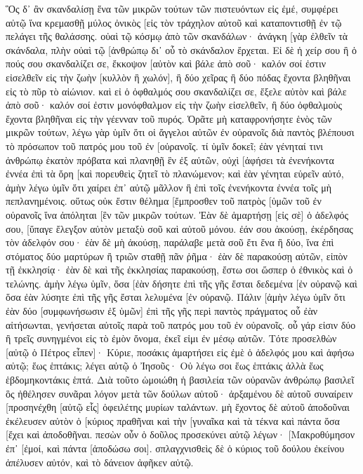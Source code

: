 Ὃς δ᾽ ἂν σκανδαλίσῃ ἕνα τῶν μικρῶν τούτων τῶν πιστευόντων εἰς ἐμέ, συμφέρει αὐτῷ ἵνα κρεμασθῇ μύλος ὀνικὸς [εἰς τὸν τράχηλον αὐτοῦ καὶ καταποντισθῇ ἐν τῷ πελάγει τῆς θαλάσσης. 
οὐαὶ τῷ κόσμῳ ἀπὸ τῶν σκανδάλων· ἀνάγκη [γὰρ ἐλθεῖν τὰ σκάνδαλα, πλὴν οὐαὶ τῷ [ἀνθρώπῳ δι᾽ οὗ τὸ σκάνδαλον ἔρχεται. 
Εἰ δὲ ἡ χείρ σου ἢ ὁ πούς σου σκανδαλίζει σε, ἔκκοψον [αὐτὸν καὶ βάλε ἀπὸ σοῦ· καλόν σοί ἐστιν εἰσελθεῖν εἰς τὴν ζωὴν [κυλλὸν ἢ χωλόν], ἢ δύο χεῖρας ἢ δύο πόδας ἔχοντα βληθῆναι εἰς τὸ πῦρ τὸ αἰώνιον. 
καὶ εἰ ὁ ὀφθαλμός σου σκανδαλίζει σε, ἔξελε αὐτὸν καὶ βάλε ἀπὸ σοῦ· καλόν σοί ἐστιν μονόφθαλμον εἰς τὴν ζωὴν εἰσελθεῖν, ἢ δύο ὀφθαλμοὺς ἔχοντα βληθῆναι εἰς τὴν γέενναν τοῦ πυρός. 
Ὁρᾶτε μὴ καταφρονήσητε ἑνὸς τῶν μικρῶν τούτων, λέγω γὰρ ὑμῖν ὅτι οἱ ἄγγελοι αὐτῶν ἐν οὐρανοῖς διὰ παντὸς βλέπουσι τὸ πρόσωπον τοῦ πατρός μου τοῦ ἐν [οὐρανοῖς. 
τί ὑμῖν δοκεῖ; ἐὰν γένηταί τινι ἀνθρώπῳ ἑκατὸν πρόβατα καὶ πλανηθῇ ἓν ἐξ αὐτῶν, οὐχὶ [ἀφήσει τὰ ἐνενήκοντα ἐννέα ἐπὶ τὰ ὄρη [καὶ πορευθεὶς ζητεῖ τὸ πλανώμενον; 
καὶ ἐὰν γένηται εὑρεῖν αὐτό, ἀμὴν λέγω ὑμῖν ὅτι χαίρει ἐπ᾽ αὐτῷ μᾶλλον ἢ ἐπὶ τοῖς ἐνενήκοντα ἐννέα τοῖς μὴ πεπλανημένοις. 
οὕτως οὐκ ἔστιν θέλημα [ἔμπροσθεν τοῦ πατρὸς [ὑμῶν τοῦ ἐν οὐρανοῖς ἵνα ἀπόληται [ἓν τῶν μικρῶν τούτων. 
Ἐὰν δὲ ἁμαρτήσῃ [εἰς σὲ] ὁ ἀδελφός σου, [ὕπαγε ἔλεγξον αὐτὸν μεταξὺ σοῦ καὶ αὐτοῦ μόνου. ἐάν σου ἀκούσῃ, ἐκέρδησας τὸν ἀδελφόν σου· 
ἐὰν δὲ μὴ ἀκούσῃ, παράλαβε μετὰ σοῦ ἔτι ἕνα ἢ δύο, ἵνα ἐπὶ στόματος δύο μαρτύρων ἢ τριῶν σταθῇ πᾶν ῥῆμα· 
ἐὰν δὲ παρακούσῃ αὐτῶν, εἰπὸν τῇ ἐκκλησίᾳ· ἐὰν δὲ καὶ τῆς ἐκκλησίας παρακούσῃ, ἔστω σοι ὥσπερ ὁ ἐθνικὸς καὶ ὁ τελώνης. 
ἀμὴν λέγω ὑμῖν, ὅσα [ἐὰν δήσητε ἐπὶ τῆς γῆς ἔσται δεδεμένα [ἐν οὐρανῷ καὶ ὅσα ἐὰν λύσητε ἐπὶ τῆς γῆς ἔσται λελυμένα [ἐν οὐρανῷ. 
Πάλιν [ἀμὴν λέγω ὑμῖν ὅτι ἐὰν δύο [συμφωνήσωσιν ἐξ ὑμῶν] ἐπὶ τῆς γῆς περὶ παντὸς πράγματος οὗ ἐὰν αἰτήσωνται, γενήσεται αὐτοῖς παρὰ τοῦ πατρός μου τοῦ ἐν οὐρανοῖς. 
οὗ γάρ εἰσιν δύο ἢ τρεῖς συνηγμένοι εἰς τὸ ἐμὸν ὄνομα, ἐκεῖ εἰμι ἐν μέσῳ αὐτῶν. 
Τότε προσελθὼν [αὐτῷ ὁ Πέτρος εἶπεν]· Κύριε, ποσάκις ἁμαρτήσει εἰς ἐμὲ ὁ ἀδελφός μου καὶ ἀφήσω αὐτῷ; ἕως ἑπτάκις; 
λέγει αὐτῷ ὁ Ἰησοῦς· Οὐ λέγω σοι ἕως ἑπτάκις ἀλλὰ ἕως ἑβδομηκοντάκις ἑπτά. 
Διὰ τοῦτο ὡμοιώθη ἡ βασιλεία τῶν οὐρανῶν ἀνθρώπῳ βασιλεῖ ὃς ἠθέλησεν συνᾶραι λόγον μετὰ τῶν δούλων αὐτοῦ· 
ἀρξαμένου δὲ αὐτοῦ συναίρειν [προσηνέχθη [αὐτῷ εἷς] ὀφειλέτης μυρίων ταλάντων. 
μὴ ἔχοντος δὲ αὐτοῦ ἀποδοῦναι ἐκέλευσεν αὐτὸν ὁ [κύριος πραθῆναι καὶ τὴν [γυναῖκα καὶ τὰ τέκνα καὶ πάντα ὅσα [ἔχει καὶ ἀποδοθῆναι. 
πεσὼν οὖν ὁ δοῦλος προσεκύνει αὐτῷ λέγων· [Μακροθύμησον ἐπ᾽ [ἐμοί, καὶ πάντα [ἀποδώσω σοι]. 
σπλαγχνισθεὶς δὲ ὁ κύριος τοῦ δούλου ἐκείνου ἀπέλυσεν αὐτόν, καὶ τὸ δάνειον ἀφῆκεν αὐτῷ. 
